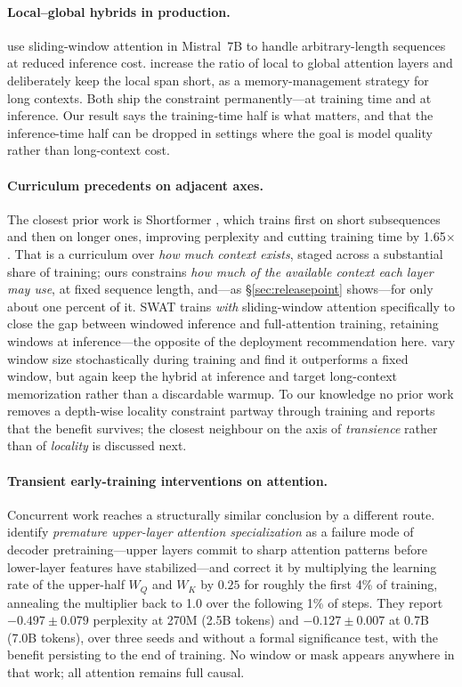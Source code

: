 \documentclass[11pt,a4paper]{article}
\begin{document}
\paragraph{Local--global hybrids in production.} \citet{jiang2023mistral} use sliding-window attention in Mistral~7B to handle arbitrary-length sequences at reduced inference cost. \citet{gemma3} increase the ratio of local to global attention layers and deliberately keep the local span short, as a memory-management strategy for long contexts. Both ship the constraint permanently---at training time and at inference. Our result says the training-time half is what matters, and that the inference-time half can be dropped in settings where the goal is model quality rather than long-context cost.

\paragraph{Curriculum precedents on adjacent axes.} The closest prior work is Shortformer \citep{press2021shortformer}, which trains first on short subsequences and then on longer ones, improving perplexity and cutting training time by 1.65$\times$. That is a curriculum over \emph{how much context exists}, staged across a substantial share of training; ours constrains \emph{how much of the available context each layer may use}, at fixed sequence length, and---as \S\ref{sec:releasepoint} shows---for only about one percent of it. SWAT \citep{fu2025swat} trains \emph{with} sliding-window attention specifically to close the gap between windowed inference and full-attention training, retaining windows at inference---the opposite of the deployment recommendation here. \citet{cabannes2025short} vary window size stochastically during training and find it outperforms a fixed window, but again keep the hybrid at inference and target long-context memorization rather than a discardable warmup. To our knowledge no prior work removes a depth-wise locality constraint partway through training and reports that the benefit survives; the closest neighbour on the axis of \emph{transience} rather than of \emph{locality} is discussed next.

\paragraph{Transient early-training interventions on attention.} Concurrent work reaches a structurally similar conclusion by a different route. \citet{zhu2026learningless} identify \emph{premature upper-layer attention specialization} as a failure mode of decoder pretraining---upper layers commit to sharp attention patterns before lower-layer features have stabilized---and correct it by multiplying the learning rate of the upper-half $W_Q$ and $W_K$ by $0.25$ for roughly the first 4\% of training, annealing the multiplier back to 1.0 over the following 1\% of steps. They report $-0.497 \pm 0.079$ perplexity at 270M (2.5B tokens) and $-0.127 \pm 0.007$ at 0.7B (7.0B tokens), over three seeds and without a formal significance test, with the benefit persisting to the end of training. No window or mask appears anywhere in that work; all attention remains full causal.
\end{document}
